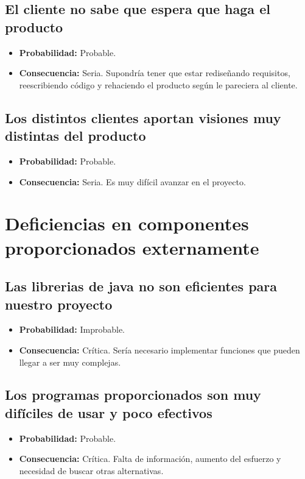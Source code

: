\documentclass[spanish,a4paper,12pt]{report}	%
\begin{document}
\subsection*{El cliente no sabe que espera que haga el producto}	
	\begin{itemize}
		\item \textbf {Probabilidad: }Probable.

		\item \textbf {Consecuencia: }Seria. Supondría tener que estar rediseñando requisitos, reescribiendo código y rehaciendo el producto según le pareciera al cliente.
	\end{itemize}

\subsection*{Los distintos clientes aportan visiones muy distintas del producto}	
	\begin{itemize}
		\item \textbf {Probabilidad: }Probable.
		\item \textbf {Consecuencia: }Seria. Es muy difícil avanzar en el proyecto.
	\end{itemize}

%
\section{Deficiencias en componentes proporcionados externamente}

\subsection*{Las librerias de java no son eficientes para nuestro proyecto}	
	\begin{itemize}
		\item \textbf {Probabilidad: }Improbable.
		\item \textbf {Consecuencia: }Crítica. Sería necesario implementar funciones que pueden llegar a ser muy complejas.
	\end{itemize}

\subsection*{Los programas proporcionados son muy difíciles de usar y poco efectivos}	
	\begin{itemize}
		\item \textbf {Probabilidad: }Probable.
		\item \textbf {Consecuencia: }Crítica. Falta de información, aumento del esfuerzo y necesidad de buscar otras alternativas.
	\end{itemize}
\end{document}
